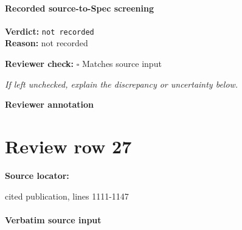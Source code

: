 \documentclass[10pt]{article}
\newcommand{\reviewerbox}{%
  \par\noindent\fbox{\parbox{0.96\linewidth}{\rule{0pt}{0.38in}}}\par
}
\newcommand{\reviewmatch}[1]{%
  \par\noindent\textbf{Reviewer check:} $\square$\; #1\par
  \noindent\emph{If left unchecked, explain the discrepancy or uncertainty below.}\par
}
\begin{document}
\paragraph{Recorded source-to-Spec screening}
\textbf{Verdict:} \texttt{not recorded}
\\
\textbf{Reason:} not recorded
\reviewmatch{Matches source input}
\noindent\textbf{Reviewer annotation}\par
\reviewerbox
\clearpage
\hypertarget{source-claim-34bc63da82092219}{}
\section*{Review row 27}
\textbf{Source locator:} {\footnotesize\raggedright cited publication, lines 1111-\allowbreak{}1147\par}
\paragraph{Verbatim source input}
\end{document}
